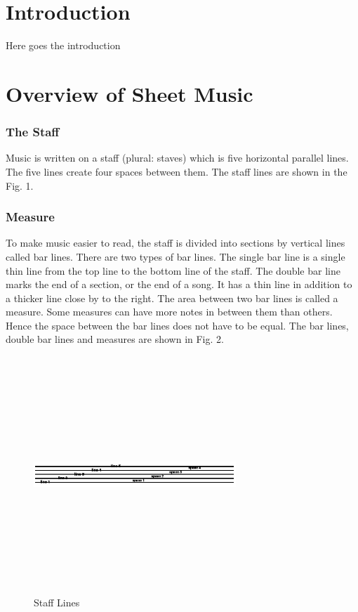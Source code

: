 \documentclass[journal]{IEEEtran}
\begin{document}
%
\IEEEpeerreviewmaketitle



\section{Introduction}
Here goes the introduction

\section{Overview of Sheet Music}
\subsubsection{The Staff}
Music is written on a staff (plural: staves) which is five horizontal parallel lines. The five lines
create four spaces between them. The staff lines are shown in the Fig. 1.

\subsubsection{Measure}
To make music easier to read, the staff is divided into sections by vertical lines called bar lines.
There are two types of bar lines. The single bar line is a single thin line from the top line to the
bottom line of the staff. The double bar line marks the end of a section, or the end of a song. It has
a thin line in addition to a thicker line close by to the right.
The area between two bar lines is called a measure. Some measures can have more notes in
between them than others. Hence the space between the bar lines does not have to be equal. The
bar lines, double bar lines and measures are shown in Fig. 2.

\begin{figure}
\includegraphics[width=3in,height=3.5in,clip,keepaspectratio]{resources/images/staff_line}
\centering
\caption{Staff Lines}
\end{figure}
\end{document}
